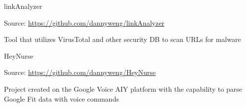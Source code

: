 
\begin{cventries}
  \cventry
    {} %
    {linkAnalyzer} %
    {} %
    {} %
    {
      \begin{cvitems} %
        \item {Source: \url{https://github.com/dannyweng/linkAnalyzer}}
		    \item {Tool that utilizes VirusTotal and other security DB to scan URLs for malware}
      \end{cvitems}
    }

  \cventry
    {} %
    {HeyNurse} %
    {} %
    {} %
    {
      \begin{cvitems} %
        \item {Source: \url{https://github.com/dannyweng/HeyNurse}}
		    \item {Project created on the Google Voice AIY platform with the capability to parse Google Fit data with voice commands}
      \end{cvitems}
    }


\end{cventries}
